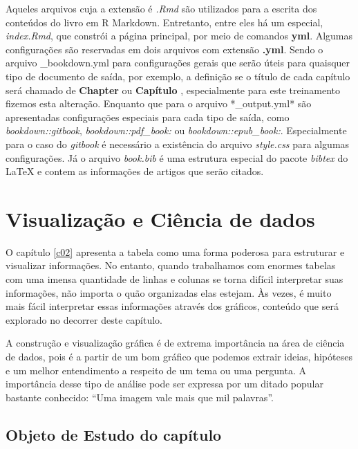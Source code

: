 \documentclass[
]{book}
\begin{document}
Aqueles arquivos cuja a extensão é \emph{.Rmd}
são utilizados para a escrita dos
conteúdos do livro em R Markdown. Entretanto,
entre eles
há um especial, \emph{index.Rmd}, que constrói
a página principal, por meio de
comandos \textbf{yml}. Algumas configurações
são reservadas em dois arquivos com extensão
\textbf{.yml}. Sendo o arquivo \_bookdown.yml para
configurações gerais que serão úteis para quaisquer
tipo de documento de saída, por exemplo, a definição
se o título de cada capítulo será chamado de
\textbf{Chapter } ou \textbf{Capítulo }, especialmente
para este treinamento fizemos esta alteração. Enquanto
que para o arquivo *\_output.yml* são apresentadas
configurações especiais para cada tipo de saída,
como \emph{bookdown::gitbook}, \emph{bookdown::pdf\_book:} ou
\emph{bookdown::epub\_book:}. Especialmente para o
caso do \emph{gitbook} é necessário a existência do arquivo
\emph{style.css} para algumas configurações. Já o arquivo
\emph{book.bib} é uma estrutura especial do pacote \emph{bibtex}
do LaTeX e contem as informações de artigos que serão citados.

\hypertarget{c03}{%
\chapter{Visualização e Ciência de dados}\label{c03}}

O capítulo \ref{c02} apresenta a tabela como uma forma poderosa para estruturar e visualizar informações. No entanto, quando trabalhamos com enormes tabelas com uma imensa quantidade de linhas e colunas se torna difícil interpretar suas informações, não importa o quão organizadas elas estejam. Às vezes, é muito mais fácil interpretar essas informações através dos gráficos, conteúdo que será explorado no decorrer deste capítulo.

A construção e visualização gráfica é de extrema importância na área de ciência de dados, pois é a partir de um bom gráfico que podemos extrair ideias, hipóteses e um melhor entendimento a respeito de um tema ou uma pergunta. A importância desse tipo de análise pode ser expressa por um ditado popular bastante conhecido: ``Uma imagem vale mais que mil palavras''.

\hypertarget{objeto-de-estudo-do-capuxedtulo}{%
\section{Objeto de Estudo do capítulo}\label{objeto-de-estudo-do-capuxedtulo}}
\end{document}
